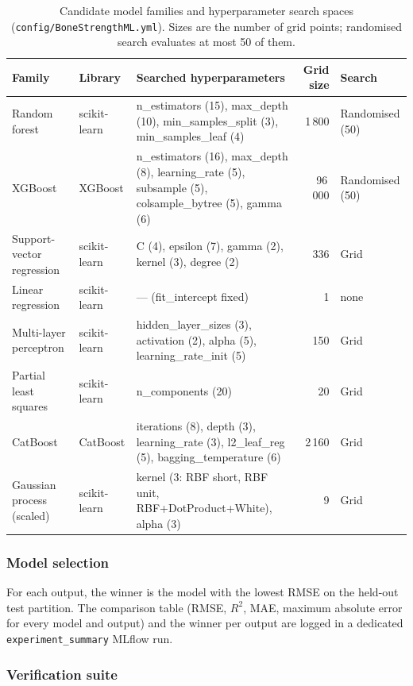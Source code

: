 \begin{table}[htbp]
  \centering
  \caption{Candidate model families and hyperparameter search spaces
    (\texttt{config/BoneStrengthML.yml}). Sizes are the number of grid points;
    randomised search evaluates at most 50 of them.}
  \label{tab:models}
  \small
  \begin{tabular}{llp{6.2cm}rl}
    \toprule
    Family & Library & Searched hyperparameters & Grid size & Search \\
    \midrule
    Random forest & scikit-learn & n\_estimators (15), max\_depth (10), min\_samples\_split (3), min\_samples\_leaf (4) & 1\,800 & Randomised (50) \\
    XGBoost & XGBoost & n\_estimators (16), max\_depth (8), learning\_rate (5), subsample (5), colsample\_bytree (5), gamma (6) & 96\,000 & Randomised (50) \\
    Support-vector regression & scikit-learn & C (4), epsilon (7), gamma (2), kernel (3), degree (2) & 336 & Grid \\
    Linear regression & scikit-learn & --- (fit\_intercept fixed) & 1 & none \\
    Multi-layer perceptron & scikit-learn & hidden\_layer\_sizes (3), activation (2), alpha (5), learning\_rate\_init (5) & 150 & Grid \\
    Partial least squares & scikit-learn & n\_components (20) & 20 & Grid \\
    CatBoost & CatBoost & iterations (8), depth (3), learning\_rate (3), l2\_leaf\_reg (5), bagging\_temperature (6) & 2\,160 & Grid \\
    Gaussian process (scaled) & scikit-learn & kernel (3: RBF short, RBF unit, RBF+DotProduct+White), alpha (3) & 9 & Grid \\
    \bottomrule
  \end{tabular}
\end{table}

\subsubsection{Model selection}

For each output, the winner is the model with the lowest RMSE on the held-out
test partition. The comparison table (RMSE, $R^2$, MAE, maximum absolute
error for every model and output) and the winner per output are logged in a
dedicated \texttt{experiment\_summary} MLflow run.

\subsubsection{Verification suite}
\label{sec:methods:verification}

